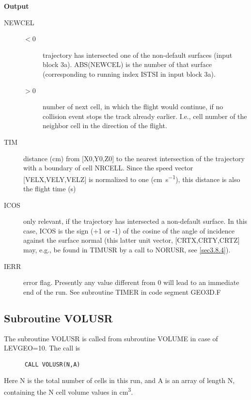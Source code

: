 \textbf{Output} 

\begin{description}
  \item[NEWCEL]
        \begin{description}
          \item[$< 0$] trajectory
                has intersected one of the non-default surfaces (input block 3a).
                ABS(NEWCEL) is the number of that surface (corresponding to running index ISTSI
                in input block 3a).
          \item[$> 0$] number of next cell, in which the flight would continue, if no
                collision event stops the track already earlier.
                I.e., cell number of the neighbor cell in the direction of the flight.
        \end{description}
  \item[TIM] distance (\si{\centi\metre}) from [X0,Y0,Z0] to the nearest
        intersection of the trajectory with a boundary of cell NRCELL.
        Since the speed vector [VELX,VELY,VELZ] is normalized to one
        (\si{\centi\metre\per\second}), this distance is also the flight time
        (\si{\second})
  \item[ICOS] only relevant, if the trajectory has intersected a
        non-default surface.
        In this case, ICOS is the sign (+1 or -1) of the cosine of the angle of
        incidence against the surface normal (this latter unit vector, [CRTX,CRTY,CRTZ]
        may, e.g., be found in TIMUSR by a call to NORUSR, see \cref{sec3.8.4}).
  \item[IERR] error flag.
        Presently any value different from 0 will lead to an immediate end of the run.
        See subroutine TIMER in code segment GEO3D.F
\end{description}

\subsection{Subroutine VOLUSR} \label{sec3.8.3} 

The subroutine VOLUSR is called from subroutine VOLUME in case of LEVGEO=10.
The call is 

\begin{lstlisting}
      CALL VOLUSR(N,A)
\end{lstlisting} 

Here N is the total number of cells in this run, and A is an array of length N,
containing the N cell volume values in \si{\cubic\centi\metre}.

